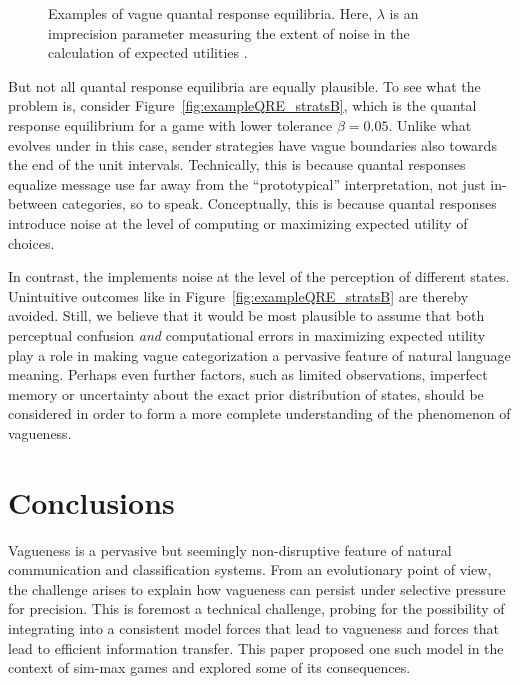 \documentclass[fleqn,reqno,10pt]{article}
\newcommand{\rdd}{\acro{rdd}} %
\newcommand{\toler}{\ensuremath{\beta}} %
\begin{document}
\begin{figure}
  \caption{Examples of vague quantal response equilibria. Here, $\lambda$ is an imprecision
    parameter measuring the extent of noise in the calculation of expected utilities
    \citep[see][for details]{FrankeJager2010:Vagueness-Signa}.}
  \label{fig:exampleQREs}
\end{figure}


But not all quantal response equilibria are equally plausible.  To see what the problem is,
consider Figure~\ref{fig:exampleQRE_stratsB}, which is the quantal response equilibrium for a
game with lower tolerance $\toler = 0.05$. Unlike what evolves under \rdd in this case, sender
strategies have vague boundaries also towards the end of the unit intervals. Technically, this
is because quantal responses equalize message use far away from the ``prototypical''
interpretation, not just in-between categories, so to speak. Conceptually, this is because
quantal responses introduce noise at the level of computing or maximizing expected utility of
choices. 

In contrast, the \rdd implements noise at the level of the perception of different
states. Unintuitive outcomes like in Figure~\ref{fig:exampleQRE_stratsB} are thereby
avoided. Still, we believe that it would be most plausible to assume that both perceptual
confusion \emph{and} computational errors in maximizing expected utility play a role in making
vague categorization a pervasive feature of natural language meaning. Perhaps even further
factors, such as limited observations, imperfect memory or uncertainty about the exact prior
distribution of states, should be considered in order to form a more complete understanding of
the phenomenon of vagueness.


\section{Conclusions}
\label{sec:conclusions}

Vagueness is a pervasive but seemingly non-disruptive feature of
natural communication and classification systems. From an evolutionary
point of view, the challenge arises to explain how vagueness can
persist under selective pressure for precision. This is foremost a
technical challenge, probing for the possibility of integrating into a
consistent model forces that lead to vagueness and forces that lead
to efficient information transfer. This paper proposed one such model
in the context of sim-max games and explored some of its consequences.
\end{document}
